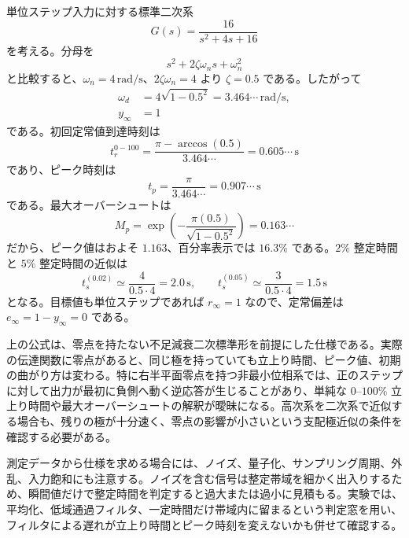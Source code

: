 \begin{example}[標準二次系の過渡仕様]
単位ステップ入力に対する標準二次系
\begin{equation}
  G(s)=\frac{16}{s^2+4s+16}
\end{equation}
を考える。分母を
\begin{equation}
  s^2+2\zeta\omega_n s+\omega_n^2
\end{equation}
と比較すると、$\omega_n=4\,\mathrm{rad/s}$、$2\zeta\omega_n=4$ より $\zeta=0.5$ である。したがって
\begin{align}
  \omega_d&=4\sqrt{1-0.5^2}=3.464\cdots\,\mathrm{rad/s},\\
  y_\infty&=1
\end{align}
である。初回定常値到達時刻は
\begin{equation}
  t_r^{0-100}
  =
  \frac{\pi-\arccos(0.5)}{3.464\cdots}
  =
  0.605\cdots\,\mathrm{s}
\end{equation}
であり、ピーク時刻は
\begin{equation}
  t_p=\frac{\pi}{3.464\cdots}
  =0.907\cdots\,\mathrm{s}
\end{equation}
である。最大オーバーシュートは
\begin{equation}
  M_p
  =
  \exp\left(-\frac{\pi(0.5)}{\sqrt{1-0.5^2}}\right)
  =
  0.163\cdots
\end{equation}
だから、ピーク値はおよそ $1.163$、百分率表示では $16.3\%$ である。$2\%$ 整定時間と $5\%$ 整定時間の近似は
\begin{equation}
  t_s^{(0.02)}\simeq\frac{4}{0.5\cdot4}=2.0\,\mathrm{s},
  \qquad
  t_s^{(0.05)}\simeq\frac{3}{0.5\cdot4}=1.5\,\mathrm{s}
\end{equation}
となる。目標値も単位ステップであれば $r_\infty=1$ なので、定常偏差は $e_\infty=1-y_\infty=0$ である。
\end{example}

\begin{remark}[過渡仕様の適用範囲]
上の公式は、零点を持たない不足減衰二次標準形を前提にした仕様である。実際の伝達関数に零点があると、同じ極を持っていても立上り時間、ピーク値、初期の曲がり方は変わる。特に右半平面零点を持つ非最小位相系では、正のステップに対して出力が最初に負側へ動く逆応答が生じることがあり、単純な $0$--$100\%$ 立上り時間や最大オーバーシュートの解釈が曖昧になる。高次系を二次系で近似する場合も、残りの極が十分速く、零点の影響が小さいという支配極近似の条件を確認する必要がある。

測定データから仕様を求める場合には、ノイズ、量子化、サンプリング周期、外乱、入力飽和にも注意する。ノイズを含む信号は整定帯域を細かく出入りするため、瞬間値だけで整定時間を判定すると過大または過小に見積もる。実験では、平均化、低域通過フィルタ、一定時間だけ帯域内に留まるという判定窓を用い、フィルタによる遅れが立上り時間とピーク時刻を変えないかも併せて確認する。
\end{remark}
